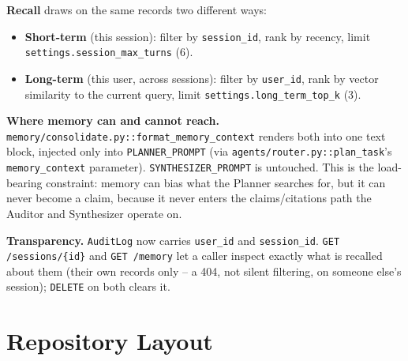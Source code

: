 \documentclass[11pt,a4paper]{report}
\newcommand{\code}[1]{\texttt{#1}}
\newcommand{\file}[1]{\texttt{\small #1}}
\begin{document}
\textbf{Recall} draws on the same records two different ways:

\begin{itemize}
    \item \textbf{Short-term} (this session): filter by \code{session\_id},
    rank by recency, limit \code{settings.session\_max\_turns} (6).
    \item \textbf{Long-term} (this user, across sessions): filter by
    \code{user\_id}, rank by vector similarity to the current query, limit
    \code{settings.long\_term\_top\_k} (3).
\end{itemize}

\textbf{Where memory can and cannot reach.}
\file{memory/consolidate.py}\code{::format\_memory\_context} renders both into
one text block, injected only into \code{PLANNER\_PROMPT} (via
\code{agents/router.py}\code{::plan\_task}'s \code{memory\_context}
parameter). \code{SYNTHESIZER\_PROMPT} is untouched. This is the load-bearing
constraint: memory can bias what the Planner searches for, but it can never
become a claim, because it never enters the claims/citations path the Auditor
and Synthesizer operate on.

\textbf{Transparency.} \code{AuditLog} now carries \code{user\_id} and
\code{session\_id}. \code{GET /sessions/\{id\}} and \code{GET /memory} let a
caller inspect exactly what is recalled about them (their own records only --
a 404, not silent filtering, on someone else's session); \code{DELETE} on
both clears it.

\chapter{Repository Layout}
\end{document}
